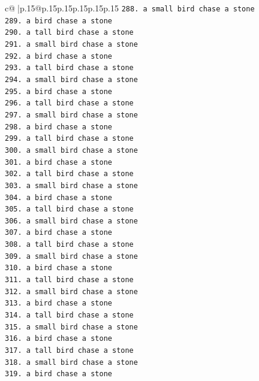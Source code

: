 \documentclass{article}
\begin{document}
{\begin{supertabular}{c@{$\;$}|p{.15\linewidth}@{}p{.15\linewidth}p{.15\linewidth}p{.15\linewidth}p{.15\linewidth}p{.15\linewidth}}
{{{\texttt{288. a small bird chase a stone} \\
\texttt{289. a bird chase a stone} \\
\texttt{290. a tall bird chase a stone} \\
\texttt{291. a small bird chase a stone} \\
\texttt{292. a bird chase a stone} \\
\texttt{293. a tall bird chase a stone} \\
\texttt{294. a small bird chase a stone} \\
\texttt{295. a bird chase a stone} \\
\texttt{296. a tall bird chase a stone} \\
\texttt{297. a small bird chase a stone} \\
\texttt{298. a bird chase a stone} \\
\texttt{299. a tall bird chase a stone} \\
\texttt{300. a small bird chase a stone} \\
\texttt{301. a bird chase a stone} \\
\texttt{302. a tall bird chase a stone} \\
\texttt{303. a small bird chase a stone} \\
\texttt{304. a bird chase a stone} \\
\texttt{305. a tall bird chase a stone} \\
\texttt{306. a small bird chase a stone} \\
\texttt{307. a bird chase a stone} \\
\texttt{308. a tall bird chase a stone} \\
\texttt{309. a small bird chase a stone} \\
\texttt{310. a bird chase a stone} \\
\texttt{311. a tall bird chase a stone} \\
\texttt{312. a small bird chase a stone} \\
\texttt{313. a bird chase a stone} \\
\texttt{314. a tall bird chase a stone} \\
\texttt{315. a small bird chase a stone} \\
\texttt{316. a bird chase a stone} \\
\texttt{317. a tall bird chase a stone} \\
\texttt{318. a small bird chase a stone} \\
\texttt{319. a bird chase a stone} \\
}}}
\end{supertabular}}
\end{document}
